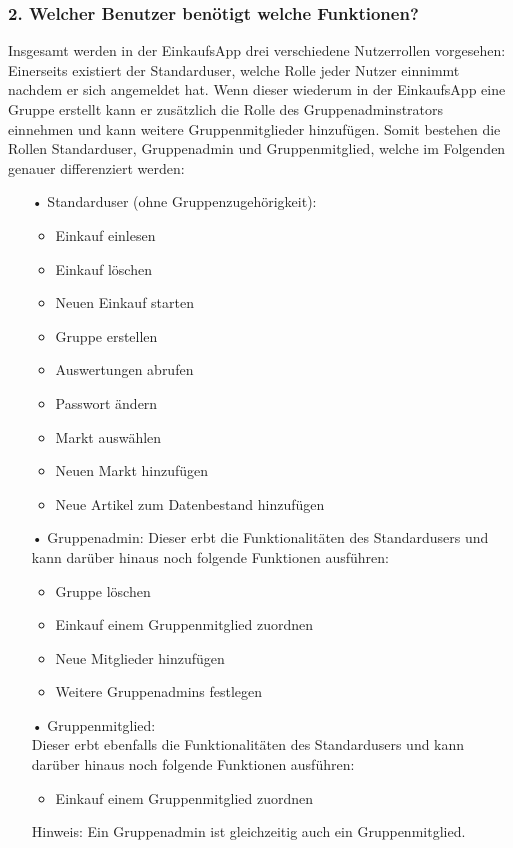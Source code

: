 \documentclass[12pt,a4paper]{article}
\begin{document}
\subsubsection*{2. Welcher Benutzer benötigt welche Funktionen?} 
Insgesamt werden in der EinkaufsApp drei verschiedene Nutzerrollen vorgesehen:
Einerseits existiert der Standarduser, welche Rolle jeder Nutzer einnimmt nachdem er sich angemeldet hat.
Wenn dieser wiederum in der EinkaufsApp eine Gruppe erstellt kann er zusätzlich die Rolle des Gruppenadminstrators einnehmen und kann weitere Gruppenmitglieder hinzufügen.
Somit bestehen die Rollen Standarduser, Gruppenadmin und Gruppenmitglied, welche im Folgenden genauer differenziert werden:
\begin{itemize}
\item[•]Standarduser (ohne Gruppenzugehörigkeit):
\begin{itemize}
\item Einkauf einlesen
\item Einkauf löschen
\item Neuen Einkauf starten
\item Gruppe erstellen
\item Auswertungen abrufen
\item Passwort ändern
\item Markt auswählen
\item Neuen Markt hinzufügen
\item Neue Artikel zum Datenbestand hinzufügen
\end{itemize}       
\end{itemize} 

\begin{itemize}
\item[•]Gruppenadmin:
\newline
Dieser erbt die Funktionalitäten des Standardusers und kann darüber hinaus noch folgende Funktionen ausführen:
\begin{itemize}
\item Gruppe löschen
\item Einkauf einem Gruppenmitglied zuordnen
\item Neue Mitglieder hinzufügen
\item Weitere Gruppenadmins festlegen
\end{itemize}
\end{itemize}

\begin{itemize}
\item[•] Gruppenmitglied:
\\
Dieser erbt ebenfalls die Funktionalitäten des Standardusers und kann darüber hinaus noch folgende Funktionen ausführen:
\begin{itemize}
\item Einkauf einem Gruppenmitglied zuordnen
\end{itemize}
Hinweis: Ein Gruppenadmin ist gleichzeitig auch ein Gruppenmitglied.
\end{itemize}
\end{document}
